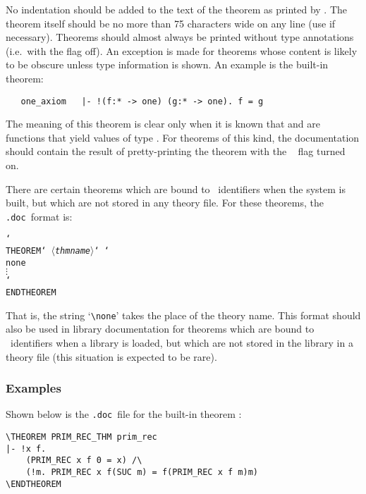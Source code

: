 \documentclass[12pt]{article}
\def\doc{{\tt .doc}}
\def\vsp{{\tt\char`\ }}
\def\bk{{\tt\char`\\ }}
\def\meta#1{\(\langle\){\it #1}\(\rangle\)}
\begin{document}
\noindent No indentation should be added to the text of the theorem as printed
by \HOL.  The theorem itself should be no more than 75 characters wide on any
line (use  if necessary).  Theorems should almost always be
printed without type annotations (i.e.\ with the  flag off).
An exception is made for theorems whose content is likely to be obscure unless
type information is shown.  An example is the built-in theorem:

\begin{hol}\begin{verbatim}
   one_axiom   |- !(f:* -> one) (g:* -> one). f = g
\end{verbatim}\end{hol}

\noindent The meaning of this theorem is clear only when it is known that
 and  are functions that yield values of type .  For
theorems of this kind, the documentation should contain the result of
pretty-printing the theorem with the \ML\  flag turned on.

There are certain theorems which  are bound to \ML\ identifiers when the
system is built, but which are not stored in any theory file.  For these
theorems, the \doc\ format is:

\smallskip

\begin{holboxed}\begin{alltt}
\bk{THEOREM}\vsp\meta{thmname}\vsp\bk{none}
\(\vdots\)
\bk{ENDTHEOREM}
\end{alltt}\end{holboxed}

\smallskip

\noindent That is, the string `{\small\verb!\none!}' takes the place of the
theory name. This format should also be used in library documentation for
theorems which are bound to \ML\ identifiers when a library is loaded, but
which are not stored in the library in a theory file (this situation is
expected to be rare).

\subsubsection{Examples}

Shown below is the \doc\ file for the built-in theorem :

\smallskip

\begin{holboxed}\begin{verbatim}
\THEOREM PRIM_REC_THM prim_rec
|- !x f.
    (PRIM_REC x f 0 = x) /\
    (!m. PRIM_REC x f(SUC m) = f(PRIM_REC x f m)m)
\ENDTHEOREM
\end{verbatim}\end{holboxed}
\end{document}
